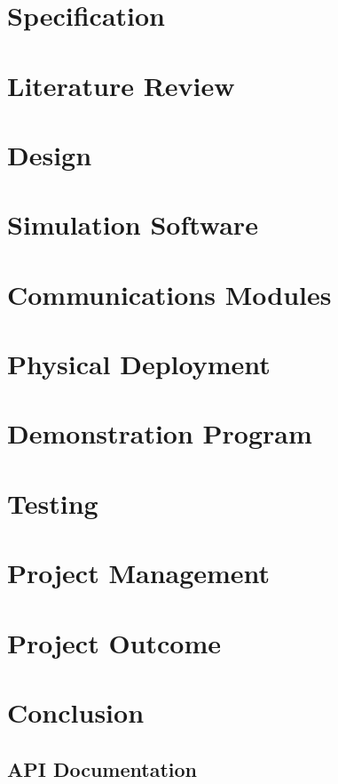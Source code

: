 \documentclass[10pt,a4paper,twoside]{report}
\begin{document}
\chapter{Specification}
	

\chapter{Literature Review}
		

\chapter{Design}
	

\chapter{Simulation Software}
	

\chapter{Communications Modules}
	

\chapter{Physical Deployment}
	

\chapter{Demonstration Program}
	

\chapter{Testing}
	

\chapter{Project Management}
	

\chapter{Project Outcome}
	

\chapter{Conclusion}
	

\begin{appendices}
\chapter{API Documentation}




\end{appendices}
\end{document}
